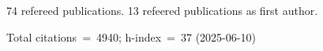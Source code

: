 74 refereed publications. 13 refeered publications as first author.

Total citations~=~4940; h-index~=~37 (2025-06-10)